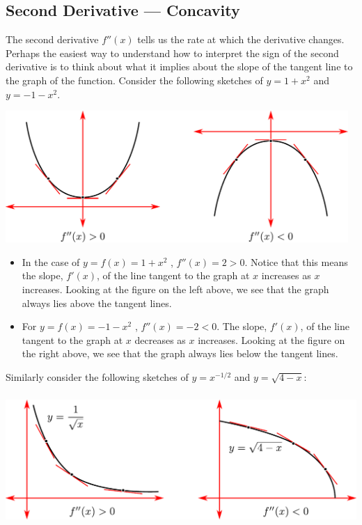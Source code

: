 \subsection{Second Derivative --- Concavity}
The second derivative $f''(x)$ tells us the rate at which the derivative changes. Perhaps
the easiest way to understand how to interpret the sign of the second derivative is to
think about what it implies about the slope of the tangent line to the graph of the
function. Consider the following sketches of $y=1+x^2$ and $y=-1-x^2$.
\begin{wfig}
 \begin{center}
  \includegraphics[height=5cm]{extra/sketch3}
 \end{center}
\end{wfig}
\begin{itemize}
 \item In the case of $y = f(x) = 1+x^2$ , $f''(x) = 2 > 0$. Notice that this means the
slope, $f'(x)$, of the line tangent to the graph at $x$ increases as $x$ increases.
Looking at the figure on the left above, we see that the graph always lies above the
tangent lines.

\item For $y = f(x) = -1-x^2$ , $f''(x) = -2 < 0$. The slope, $f'(x)$, of the line
tangent to the graph at $x$ decreases as $x$ increases. Looking at the figure on the right
above, we see that the graph always lies below the tangent lines.
\end{itemize}
Similarly consider the following sketches of $y=x^{-1/2}$ and $y=\sqrt{4-x}$:
\begin{wfig}
 \begin{center}
  \includegraphics[height=5cm]{extra/sketch4}
 \end{center}
\end{wfig}
